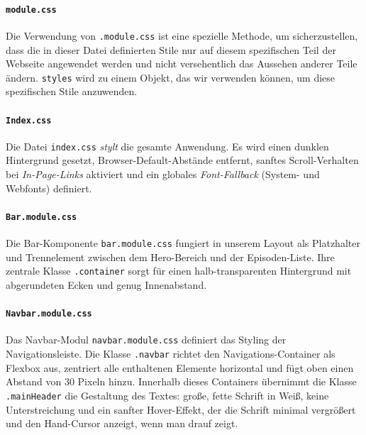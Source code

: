 \documentclass{article}
\begin{document}
\paragraph{\texttt{module.css}}
Die Verwendung von \texttt{.module.css} ist eine spezielle Methode, um sicherzustellen, dass die in dieser Datei definierten Stile nur auf diesem spezifischen Teil der Webseite angewendet werden und nicht versehentlich das Aussehen anderer Teile ändern. \texttt{styles} wird zu einem Objekt, das wir verwenden können, um diese spezifischen Stile anzuwenden.

\paragraph{\texttt{Index.css}}
\begin{sloppypar}
Die Datei \texttt{index.css} \textit{stylt} die gesamte Anwendung. Es wird einen dunklen Hintergrund gesetzt, Browser-Default-Abstände entfernt, sanftes Scroll-Verhalten bei \textit{In-Page-Links} aktiviert und ein globales \textit{Font-Fallback} (System- und Webfonts) definiert.
\end{sloppypar}

\paragraph{\texttt{Bar.module.css}}
Die Bar-Komponente \texttt{bar.module.css} fungiert in unserem Layout als Platzhalter und Trennelement zwischen dem Hero-Bereich und der Episoden-Liste. Ihre zentrale Klasse \texttt{.container} sorgt für einen halb-transparenten Hintergrund mit abgerundeten Ecken und genug Innenabstand.

\paragraph{\texttt{Navbar.module.css}}
Das Navbar-Modul \texttt{navbar.module.css} definiert das Styling der Navigationsleiste. Die Klasse \texttt{.navbar} richtet den Navigations-Container als Flexbox aus, zentriert alle enthaltenen Elemente horizontal und fügt oben einen Abstand von 30 Pixeln hinzu. Innerhalb dieses Containers übernimmt die Klasse \texttt{.mainHeader} die Gestaltung des Textes: große, fette Schrift in Weiß, keine Unterstreichung und ein sanfter Hover-Effekt, der die Schrift minimal vergrößert und den Hand-Cursor anzeigt, wenn man drauf zeigt.
\end{document}
